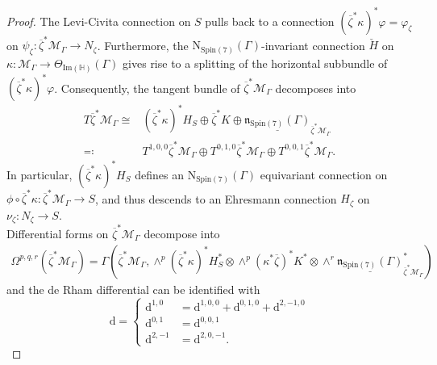 \documentclass[10pt,a4paper]{amsart}
\newcommand{\m}[1]{{\mathrm{#1}}}
\begin{document}
\begin{proof}
The Levi-Civita connection on $S$ pulls back to a connection $(\overline{\zeta}^*\kappa)^*\varphi=\varphi_\zeta$ on $\psi_\zeta \colon\overline{\zeta}^*\mathcal{M}_\Gamma\rightarrow N_\zeta$. Furthermore, 
the $\m{N}_{\m{Spin}(7)}(\Gamma)$-invariant connection ${\check{H}}$ on $\kappa \colon\mathcal{M}_\Gamma\rightarrow \Theta_{\m{Im}(\mathbb{H})}(\Gamma)$ gives rise to a splitting of the horizontal subbundle of $(\overline{\zeta}^*\kappa)^*\varphi$. Consequently, the tangent bundle of $\overline{\zeta}^*\mathcal{M}_\Gamma$ decomposes into 
\begin{align*}
    T\overline{\zeta}^*\mathcal{M}_\Gamma\cong&(\overline{\zeta}^*\kappa)^*H_S\oplus\overline{\zeta}^*K\oplus\underline{\mathfrak{n}_{\m{Spin}(7)}(\Gamma)}_{\overline{\zeta}^*\mathcal{M}_\Gamma}\\
    \eqqcolon&T^{1,0,0}\overline{\zeta}^*\mathcal{M}_\Gamma\oplus T^{0,1,0}\overline{\zeta}^*\mathcal{M}_\Gamma\oplus T^{0,0,1}\overline{\zeta}^*\mathcal{M}_\Gamma.
\end{align*}
In particular, $(\overline{\zeta}^*\kappa)^*H_S$ defines an $\m{N}_{\m{Spin}(7)}(\Gamma)$ equivariant connection on $\phi\circ\overline{\zeta}^*\kappa \colon\overline{\zeta}^*\mathcal{M}_\Gamma\rightarrow S$, and thus descends to an Ehresmann connection $H_\zeta$ on $\nu_\zeta\colon N_\zeta\rightarrow S$.\\

Differential forms on $\overline{\zeta}^*\mathcal{M}_\Gamma$ decompose into
\begin{align*}
    \Omega^{p,q,r}(\overline{\zeta}^*\mathcal{M}_\Gamma)=\Gamma(\overline{\zeta}^*\mathcal{M}_\Gamma,\wedge^p(\overline{\zeta}^*\kappa)^* H_S^* \otimes \wedge^p(\kappa^*\overline{\zeta})^*K^* \otimes\wedge^r\underline{\mathfrak{n}_{\m{Spin}(7)}(\Gamma)}_{\overline{\zeta}^*\mathcal{M}_\Gamma}^*)
\end{align*}
and the de Rham differential can be identified with 
\begin{equation*}
    \m{d}
    =\begin{cases}
        \m{d}^{1,0}&=\m{d}^{1,0,0}+\m{d}^{0,1,0}+\m{d}^{2,-1,0}\\
        \m{d}^{0,1}&=\m{d}^{0,0,1}\\
        \m{d}^{2,-1}&=\m{d}^{2,0,-1}.
    \end{cases}
\end{equation*}



\end{proof}
\end{document}
